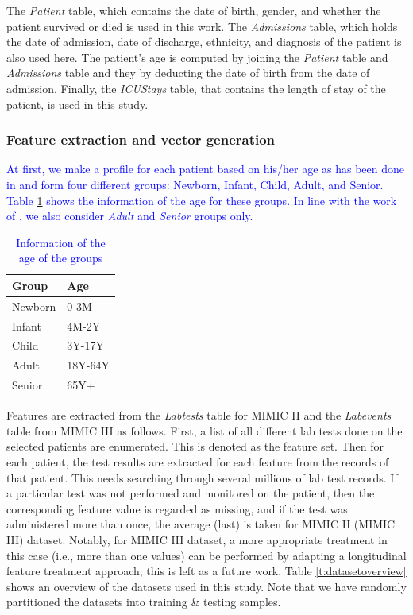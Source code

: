 The \textit{Patient} table, which contains the date of birth, gender, and whether the patient survived or died is used in this work. The \textit{Admissions} table, which holds the date of admission, date of discharge, ethnicity, and diagnosis of the patient is also used here. The patient's age is computed by joining the \textit{Patient} table and \textit{Admissions} table and they by deducting the date of birth from the date of admission. Finally, the \textit{ICUStays} table, that contains the length of stay of the patient, is used in this study.

\subsubsection{Feature extraction and vector generation} 
\textcolor{blue}{At first, we make a profile for each patient based on his/her age as has been done in \cite{mehedy-masud:2017:fvc} and form four different groups: Newborn, Infant, Child, Adult, and Senior. Table \ref{t:groupbyage} shows the information of the age for these groups. In line with the work of \cite{mehedy-masud:2017:fvc, mehedy-masud:2018:frmwrk}, we also consider \textit{Adult} and \textit{Senior} groups only.}

\begin{table}[h] 
	\centering \caption{\textcolor{blue}{Information of the age of the groups}} 
	\begin{tabular}{|l||l|}\hline
		\textbf{Group}  & \textbf{Age}  \\\hline
		Newborn & 0-3M \\\hline
		Infant &  4M-2Y\\\hline
		Child & 3Y-17Y \\\hline
		Adult & 18Y-64Y \\\hline
		Senior & 65Y+ \\\hline
	\end{tabular}
	\label{t:groupbyage}
\end{table} 

Features are extracted from the \textit{Labtests} table for MIMIC II and the \textit{Labevents} table from MIMIC III as follows. First, a list of all different lab tests done on the selected patients are enumerated. This is denoted as the feature set. Then for each patient, the test results are extracted for each feature from the records of that patient. This needs searching through several millions of lab test records. If a particular test was not performed and monitored on the patient, then the corresponding feature value is regarded as missing, and if the test was administered more than once, the average (last) is taken for MIMIC II (MIMIC III) dataset. Notably, for MIMIC III dataset, a more appropriate treatment in this case (i.e., more than one values) can be performed by adapting a longitudinal feature treatment approach; this is left as a future work. Table \ref{t:datasetoverview} shows an overview of the datasets used in this study. Note that we have randomly partitioned the datasets into training \& testing samples.

